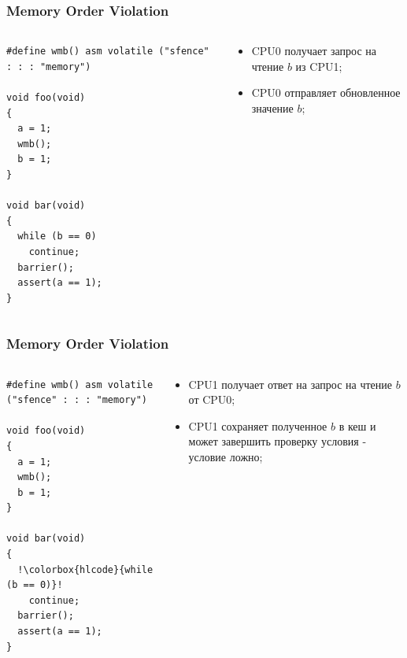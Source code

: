 \begin{frame}[fragile]
\frametitle{Memory Order Violation}

\begin{columns}[T]
  \begin{column}{.4\linewidth}
    \begin{lstlisting}[escapechar=!]
#define wmb() asm volatile ("sfence" : : : "memory")

void foo(void)
{
  a = 1;
  wmb();
  b = 1;
}

void bar(void)
{
  while (b == 0)
    continue;
  barrier();
  assert(a == 1);
}
    \end{lstlisting}
  \end{column}
  \begin{column}{.6\linewidth}
    \begin{itemize}
      \item CPU0 получает запрос на чтение $b$ из CPU1;
      \item CPU0 отправляет обновленное значение $b$;
    \end{itemize}
  \end{column}
\end{columns}
\end{frame}

\begin{frame}[fragile]
\frametitle{Memory Order Violation}

\begin{columns}[T]
  \begin{column}{.4\linewidth}
    \begin{lstlisting}[escapechar=!]
#define wmb() asm volatile ("sfence" : : : "memory")

void foo(void)
{
  a = 1;
  wmb();
  b = 1;
}

void bar(void)
{
  !\colorbox{hlcode}{while (b == 0)}!
    continue;
  barrier();
  assert(a == 1);
}
    \end{lstlisting}
  \end{column}
  \begin{column}{.6\linewidth}
    \begin{itemize}
      \item CPU1 получает ответ на запрос на чтение $b$ от CPU0;
      \item CPU1 сохраняет полученное $b$ в кеш и может завершить проверку
            условия - условие ложно;
    \end{itemize}
  \end{column}
\end{columns}
\end{frame}

